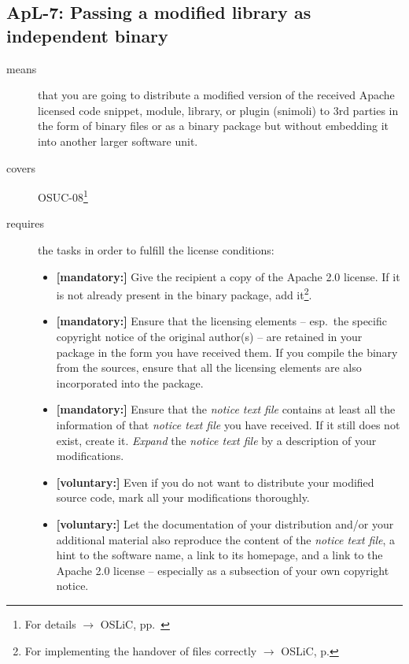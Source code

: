 \subsection{ApL-7: Passing a modified library as independent binary}

\begin{description}
\item[means] that you are going to distribute a modified version of the received
Apache licensed code snippet, module, library, or plugin (snimoli) to 3rd
parties in the form of binary files or as a binary package but without embedding
it into another larger software unit.
\item[covers] OSUC-08\footnote{For details $\rightarrow$ OSLiC, pp.\ \pageref{OSUC-08-DEF}}
\item[requires] the tasks in order to fulfill the license conditions:
\begin{itemize}
  
 \item \textbf{[mandatory:]} Give the recipient a copy of the Apache 2.0
  license. If it is not already present in the binary package, add
  it\footnote{For implementing the handover of files correctly $\rightarrow$
  OSLiC, p. \pageref{DistributingFilesHint}}.
  
  \item \textbf{[mandatory:]} Ensure that the licensing elements -- esp.\ the
  specific copyright notice of the original author(s) -- are retained in your
  package in the form you have received them. If you compile the binary from the
  sources, ensure that all the licensing elements are also incorporated into the
  package.
  
  \item \textbf{[mandatory:]} Ensure that the \emph{notice text file} contains
  at least all the information of that \emph{notice text file} you have
  received. If it still does not exist, create it. \emph{Expand} the
  \emph{notice text file} by a description of your modifications.
   
  \item \textbf{[voluntary:]} Even if you do not want to distribute your
  modified source code, mark all your modifications thoroughly.
 
  \item \textbf{[voluntary:]} Let the documentation of your distribution and/or
  your additional material also reproduce the content of the \emph{notice text
  file}, a hint to the software name, a link to its homepage, and a link to the
  Apache 2.0 license -- especially as a subsection of your own copyright notice.
  

\end{itemize}
\end{description}
